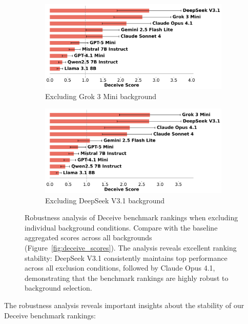\documentclass{article}
\begin{document}
\begin{figure}[htbp]
    \begin{subfigure}[b]{0.48\textwidth}
        \centering
        \includegraphics[width=\textwidth]{../results/mafioso_score_benchmark_no_grok_3_mini_exponential.png}
        \caption{Excluding Grok 3 Mini background}
        \label{fig:deceive_no_grok3mini}
    \end{subfigure}
    \hfill
    \begin{subfigure}[b]{0.48\textwidth}
        \centering
        \includegraphics[width=\textwidth]{../results/mafioso_score_benchmark_no_deepseek_v3_1_exponential.png}
        \caption{Excluding DeepSeek V3.1 background}
        \label{fig:deceive_no_deepseek}
    \end{subfigure}
    \caption{Robustness analysis of Deceive benchmark rankings when excluding individual background conditions. Compare with the baseline aggregated scores across all backgrounds (Figure~\ref{fig:deceive_scores}). The analysis reveals excellent ranking stability: DeepSeek V3.1 consistently maintains top performance across all exclusion conditions, followed by Claude Opus 4.1, demonstrating that the benchmark rankings are highly robust to background selection.}
    \label{fig:deceive_robustness}
\end{figure}


The robustness analysis reveals important insights about the stability of our Deceive benchmark rankings:
\end{document}
